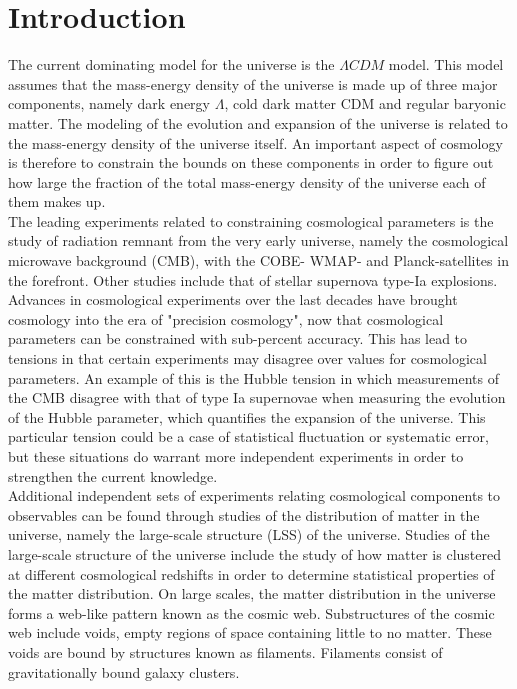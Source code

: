 \chapter{Introduction}
The current dominating model for the universe is the $\Lambda CDM$ model. This model assumes that the mass-energy density of the universe is made up of three major components, namely dark energy $\Lambda$, cold dark matter CDM and regular baryonic matter. The modeling of the evolution and expansion of the universe is related to the mass-energy density of the universe itself. An important aspect of cosmology is therefore to constrain the bounds on these components in order to figure out how large the fraction of the total mass-energy density of the universe each of them makes up.\\\indent
The leading experiments related to constraining cosmological parameters is the study of radiation remnant from the very early universe, namely the cosmological microwave background (CMB)\cite{1965cmb}, with the COBE-\cite{Smoot_1999} WMAP-\cite{Wmap} and Planck-satellites\cite{planckvi} in the forefront. Other studies include that of stellar supernova type-Ia explosions\cite{Pantheon}. Advances in cosmological experiments over the last decades have brought cosmology into the era of "precision cosmology", now that cosmological parameters can be constrained with sub-percent accuracy. This has lead to tensions in that certain experiments may disagree over values for cosmological parameters. An example of this is the Hubble tension in which measurements of the CMB disagree with that of type Ia supernovae when measuring the evolution of the Hubble parameter, which quantifies the expansion of the universe. This particular tension could be a case of statistical fluctuation or systematic error, but these situations do warrant more independent experiments in order to strengthen the current knowledge.\\\indent Additional independent sets of experiments relating cosmological components to observables can be found through studies of the distribution of matter in the universe, namely the large-scale structure (LSS) of the universe. Studies of the large-scale structure of the universe include the study of how matter is clustered at different cosmological redshifts in order to determine statistical properties of the matter distribution. On large scales, the matter distribution in the universe forms a web-like pattern known as the cosmic web\cite{bondweb}. Substructures of the cosmic web include voids, empty regions of space containing little to no matter. These voids are bound by structures known as filaments. Filaments consist of gravitationally bound galaxy clusters. \\\indent
